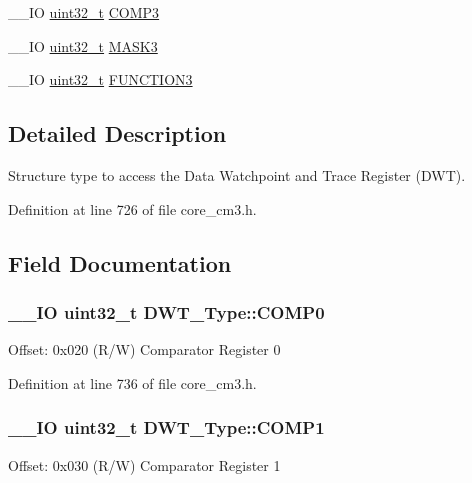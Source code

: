 \begin{DoxyCompactItemize}
\item 
\-\_\-\-\_\-\-I\-O \hyperlink{stdint_8h_a435d1572bf3f880d55459d9805097f62}{uint32\-\_\-t} \hyperlink{struct_d_w_t___type_a3df15697eec279dbbb4b4e9d9ae8b62f}{C\-O\-M\-P3}
\item 
\-\_\-\-\_\-\-I\-O \hyperlink{stdint_8h_a435d1572bf3f880d55459d9805097f62}{uint32\-\_\-t} \hyperlink{struct_d_w_t___type_ae3f01137a8d28c905ddefe7333547fba}{M\-A\-S\-K3}
\item 
\-\_\-\-\_\-\-I\-O \hyperlink{stdint_8h_a435d1572bf3f880d55459d9805097f62}{uint32\-\_\-t} \hyperlink{struct_d_w_t___type_a80bd242fc05ca80f9db681ce4d82e890}{F\-U\-N\-C\-T\-I\-O\-N3}
\end{DoxyCompactItemize}


\subsection{Detailed Description}
Structure type to access the Data Watchpoint and Trace Register (D\-W\-T). 

Definition at line 726 of file core\-\_\-cm3.\-h.



\subsection{Field Documentation}
\hypertarget{struct_d_w_t___type_a7cf71ff4b30a8362690fddd520763904}{
\subsubsection[{C\-O\-M\-P0}]{\setlength{\rightskip}{0pt plus 5cm}\-\_\-\-\_\-\-I\-O {\bf uint32\-\_\-t} D\-W\-T\-\_\-\-Type\-::\-C\-O\-M\-P0}}\label{struct_d_w_t___type_a7cf71ff4b30a8362690fddd520763904}
Offset\-: 0x020 (R/\-W) Comparator Register 0 

Definition at line 736 of file core\-\_\-cm3.\-h.

\hypertarget{struct_d_w_t___type_a4a5bb70a5ce3752bd628d5ce5658cb0c}{
\subsubsection[{C\-O\-M\-P1}]{\setlength{\rightskip}{0pt plus 5cm}\-\_\-\-\_\-\-I\-O {\bf uint32\-\_\-t} D\-W\-T\-\_\-\-Type\-::\-C\-O\-M\-P1}}\label{struct_d_w_t___type_a4a5bb70a5ce3752bd628d5ce5658cb0c}
Offset\-: 0x030 (R/\-W) Comparator Register 1 


